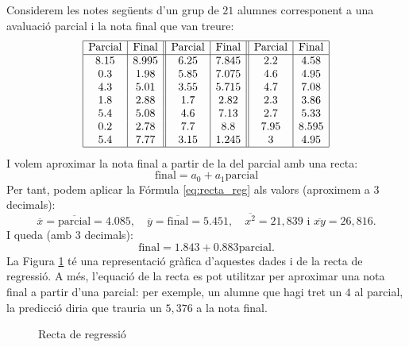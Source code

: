 \begin{exemple}
Considerem les notes següents d'un grup de $21$ alumnes corresponent a una avaluació parcial i la nota final que van treure:
\[
\begin{array}{|c|c||c|c||c|c|}
\hline\text{Parcial} & \text{Final} & \text{Parcial} & \text{Final} & \text{Parcial} & \text{Final}  \\ \hline
8.15 & 8.995 & 6.25 & 7.845 & 2.2 & 4.58 \\
0.3 & 1.98 & 5.85 & 7.075 & 4.6 &4.95 \\
4.3&5.01 & 3.55 & 5.715 & 4.7 & 7.08\\
1.8&2.88 & 1.7 & 2.82 & 2.3 & 3.86\\
5.4&5.08 & 4.6 & 7.13 & 2.7 &5.33 \\
0.2 &2.78 & 7.7 & 8.8 & 7.95 &8.595\\
5.4 & 7.77 & 3.15 &1.245 & 3 &4.95\\ \hline
\end{array}
\]
I volem aproximar la nota final a partir de la del parcial amb una recta:
\[
\text{final}= a_0 + a_1 \text{parcial}
\]
Per tant, podem aplicar la Fórmula \eqref{eq:recta_reg} als valors (aproximem a 3 decimals):
\[
\overline{x}=\overline{\text{parcial}}= 4.085, \quad
\overline{y}=\overline{\text{final}}= 5.451, \quad
\overline{x^2}=21,839 \text{ i }
\overline{xy}= 26,816.
\]
I queda (amb 3 decimals):
\[
\text{final}= 1.843 + 0.883 \text{parcial}.
\]
La Figura \ref{fig:recta_reg} té una representació gràfica d'aquestes dades i de la recta de regressió. A més, l'equació de la recta es pot utilitzar per aproximar una nota final a partir d'una parcial: per exemple, un alumne que hagi tret un $4$ al parcial, la predicció diria que trauria un $5,376$ a la nota final.
\begin{figure}[ht]
\caption{Recta de regressió\label{fig:recta_reg}}
\end{figure}
\end{exemple}

